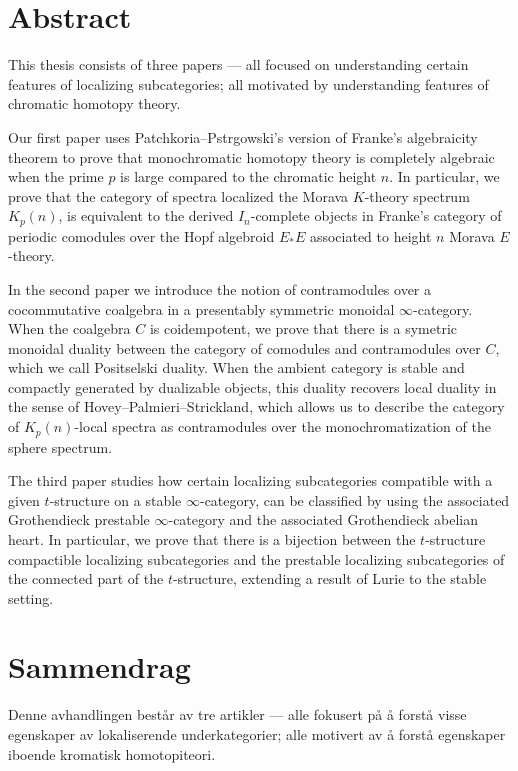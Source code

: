 

\section*{Abstract}

This thesis consists of three papers --- all focused on understanding certain features of localizing subcategories; all motivated by understanding features of chromatic homotopy theory. 

Our first paper uses Patchkoria--Pstr\a{}gowski's version of Franke's algebraicity theorem to prove that monochromatic homotopy theory is completely algebraic when the prime $p$ is large compared to the chromatic height $n$. In particular, we prove that the category of spectra localized the Morava $K$-theory spectrum $K_p(n)$, is equivalent to the derived $I_n$-complete objects in Franke's category of periodic comodules over the Hopf algebroid $E_*E$ associated to height $n$ Morava $E$-theory. 

In the second paper we introduce the notion of contramodules over a cocommutative coalgebra in a presentably symmetric monoidal $\infty$-category. When the coalgebra $C$ is coidempotent, we prove that there is a symetric monoidal duality between the category of comodules and contramodules over $C$, which we call Positselski duality. When the ambient category is stable and compactly generated by dualizable objects, this duality recovers local duality in the sense of Hovey--Palmieri--Strickland, which allows us to describe the category of $K_p(n)$-local spectra as contramodules over the monochromatization of the sphere spectrum. 

The third paper studies how certain localizing subcategories compatible with a given $t$-structure on a stable $\infty$-category, can be classified by using the associated Grothendieck prestable $\infty$-category and the associated Grothendieck abelian heart. In particular, we prove that there is a bijection between the $t$-structure compactible localizing subcategories and the prestable localizing subcategories of the connected part of the $t$-structure, extending a result of Lurie to the stable setting. 


\newpage 
\section*{Sammendrag}

Denne avhandlingen består av tre artikler --- alle fokusert på å forstå visse egenskaper av lokaliserende underkategorier; alle motivert av å forstå egenskaper iboende kromatisk homotopiteori. 

